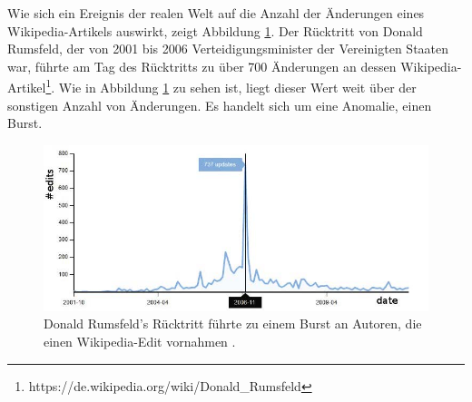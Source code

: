 Wie sich ein Ereignis der realen Welt auf die Anzahl der Änderungen eines Wikipedia-Artikels auswirkt, zeigt Abbildung \ref{fig:donald_rumsfelds_resignation_burst}.
Der Rücktritt von Donald Rumsfeld, der von 2001 bis 2006 Verteidigungsminister der Vereinigten Staaten war, führte am Tag des Rücktritts
zu über 700 Änderungen an dessen Wikipedia-Artikel\footnote{https://de.wikipedia.org/wiki/Donald\_Rumsfeld}. Wie in Abbildung \ref{fig:donald_rumsfelds_resignation_burst}
zu sehen ist, liegt dieser Wert weit über der sonstigen Anzahl von Änderungen. Es handelt sich um eine Anomalie, einen Burst.

\begin{figure}[h]
    \includegraphics[width=.5\textwidth]{images/Extracting_EventRelated_Information_from_Article.jpg}
    \caption{Donald Rumsfeld’s Rücktritt führte zu einem Burst an Autoren, die einen Wikipedia-Edit vornahmen \cite{10.1007978-3-642-36973-5_22}.}
    \label{fig:donald_rumsfelds_resignation_burst}
\end{figure}